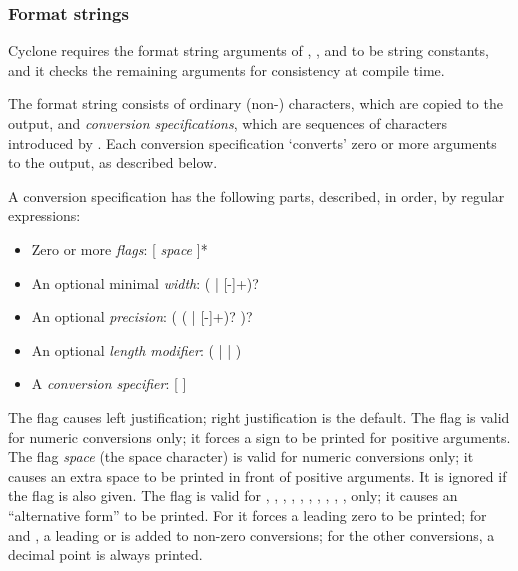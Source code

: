 \subsubsection*{Format strings}

Cyclone requires the format string arguments of ,
, and  to be string constants, and it checks
the remaining arguments for consistency at compile time.

The format string consists of ordinary (non-\code{\%}) characters, which
are copied to the output, and \emph{conversion specifications}, which
are sequences of characters introduced by \code{\%}.  Each conversion
specification `converts' zero or more arguments to the output, as
described below.

A conversion specification has the following parts, described, in order,
by regular expressions:
\begin{itemize}
\item Zero or more \emph{flags}:
[\code{-} \code{+} \emph{space} \code{\#} ]*
\item An optional minimal \emph{width}:
(\code{*} | [-]+)?
\item An optional \emph{precision}:
( (\code{*} | [-]+)? )?
\item An optional \emph{length modifier}:
( |  |  )
\item A \emph{conversion specifier}:
[                 \code{\%}]
\end{itemize}

The flag \code{-} causes left justification; right justification is the
default.  The flag \code{+} is valid for numeric conversions only; it
forces a \code{+} sign to be printed for positive arguments.  The flag
\emph{space} (the space character) is valid for numeric conversions only;
it causes an extra space to be printed in front of positive arguments.
It is ignored if the \code{+} flag is also given.
The flag \code{\#} is valid for , , , ,
, , , , , , 
only; it causes an ``alternative form'' to be printed.  For  it
forces a leading zero to be printed; for  and , a
leading  or  is added to non-zero conversions; for the
other conversions, a decimal point is always printed.

